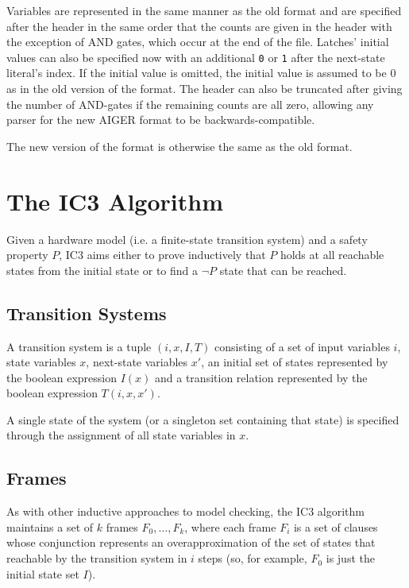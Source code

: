 \documentclass[12pt,a4paper,twoside,openright]{report}
\begin{document}
Variables are represented in the same manner as the old format
and are specified after the header in the same order that the counts
are given in the header with the exception of AND gates, which
occur at the end of the file. Latches' initial values can also be specified
now with an additional \verb,0, or \verb,1, after the next-state literal's
index. If the initial value is omitted, the initial value is assumed to be
0 as in the old version of the format. The header can also be truncated
after giving the number of AND-gates if the remaining counts are all
zero, allowing any parser for the new AIGER format to be
backwards-compatible.

The new version of the format is otherwise
the same as the old format.

\section{The IC3 Algorithm}
Given a hardware model (i.e. a finite-state transition system) and a
safety property $P$, IC3 aims either to prove inductively that $P$ holds
at all reachable states from the initial state or
to find a $\neg P$ state that can be reached.

\begin{algorithm}[H]
\DontPrintSemicolon
{}
\end{algorithm}
\subsection{Transition Systems}
A transition system is a tuple $(i,x,I,T)$ consisting of a set of input
variables $i$, state variables $x$, next-state variables $x'$, an initial
set of states represented by the boolean expression $I(x)$ and
a transition relation represented by the boolean expression $T(i,x,x')$.

A single state of the system (or a singleton set containing that state) is
specified through the assignment
of all state variables in $x$.

\subsection{Frames}
As with other inductive approaches to model checking,
the IC3 algorithm maintains a set of $k$ frames $F_0,\ldots,F_k$, where
each frame $F_i$ is a set of clauses whose conjunction represents an
overapproximation of the set of states that reachable by the transition
system in $i$ steps
(so, for example, $F_0$ is just the initial state set $I$).
\end{document}
